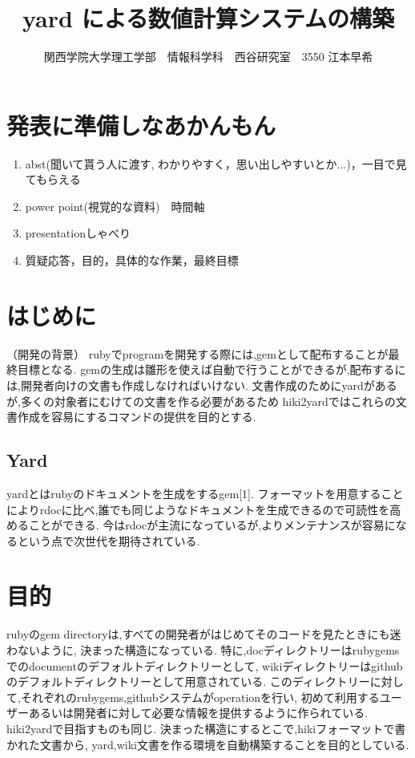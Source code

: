 \documentclass[10pt,a4j,twocolumn]{jsarticle}
\begin{document}
\title{yard による数値計算システムの構築}
\author{関西学院大学理工学部　情報科学科　西谷研究室　3550 江本早希}
\date{}
\maketitle
\section{発表に準備しなあかんもん}\begin{enumerate}
\item abst(聞いて貰う人に渡す, わかりやすく，思い出しやすいとか...)，一目で見てもらえる
\item power point(視覚的な資料)　時間軸
\item presentationしゃべり
\item 質疑応答，目的，具体的な作業，最終目標
\end{enumerate}
\section{はじめに}
（開発の背景）
rubyでprogramを開発する際には,gemとして配布することが最終目標となる.
gemの生成は雛形を使えば自動で行うことができるが,配布するには,開発者向けの文書も作成しなければいけない.
文書作成のためにyardがあるが,多くの対象者にむけての文書を作る必要があるため
hiki2yardではこれらの文書作成を容易にするコマンドの提供を目的とする.

\subsection{Yard}
yardとはrubyのドキュメントを生成をするgem[1].
フォーマットを用意することによりrdocに比べ,誰でも同じようなドキュメントを生成できるので可読性を高めることができる.
今はrdocが主流になっているが,よりメンテナンスが容易になるという点で次世代を期待されている.

\section{目的}
rubyのgem directoryは,すべての開発者がはじめてそのコードを見たときにも迷わないように,
決まった構造になっている.
特に,docディレクトリーはrubygemsでのdocumentのデフォルトディレクトリーとして,
wikiディレクトリーはgithubのデフォルトディレクトリーとして用意されている.
このディレクトリーに対して,それぞれのrubygems,githubシステムがoperationを行い,
初めて利用するユーザーあるいは開発者に対して必要な情報を提供するように作られている.
hiki2yardで目指すものも同じ.
決まった構造にするとこで,hikiフォーマットで書かれた文書から,
yard,wiki文書を作る環境を自動構築することを目的としている.
\end{document}
